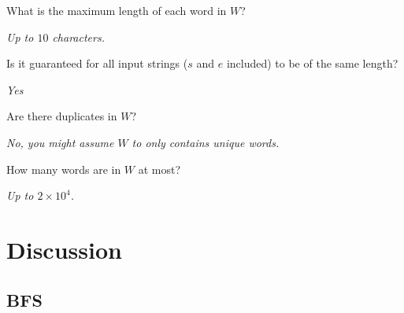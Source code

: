 \begin{QandA}
	\item What is the maximum length of each word in $W$?
	\begin{answered}
		\textit{Up to $10$ characters.}
	\end{answered}
	
	\item Is it guaranteed for all input strings ($s$ and $e$ included) to be of the same length?
	\begin{answered}
		\textit{Yes}
	\end{answered}

	\item Are there duplicates in $W$?
	\begin{answered}
		\textit{No, you might assume $W$ to only contains unique words.}
	\end{answered}

	\item How many words are in $W$ at most?
	\begin{answered}
		\textit{Up to $2\times 10^4$.}
	\end{answered}

\end{QandA}

\section{Discussion}
\label{word_ladder:sec:discussion}


\subsection{BFS}
\label{word_ladder:sec:bruteforce}


